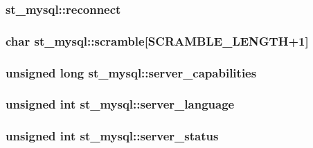 \subsubsection[{reconnect}]{ st\+\_\+mysql\+::reconnect}\label{structst__mysql_a802266361a427c12d6cb29a27f8889b1}
\hypertarget{structst__mysql_ae6e34dfb59ec6f6842f65a58eb6bee38}{}
\subsubsection[{scramble}]{\setlength{\rightskip}{0pt plus 5cm}char st\+\_\+mysql\+::scramble\mbox{[}{\bf S\+C\+R\+A\+M\+B\+L\+E\+\_\+\+L\+E\+N\+G\+T\+H}+1\mbox{]}}\label{structst__mysql_ae6e34dfb59ec6f6842f65a58eb6bee38}
\hypertarget{structst__mysql_ab9c7460496350f7aa331c104aa54717d}{}
\subsubsection[{server\+\_\+capabilities}]{\setlength{\rightskip}{0pt plus 5cm}unsigned long st\+\_\+mysql\+::server\+\_\+capabilities}\label{structst__mysql_ab9c7460496350f7aa331c104aa54717d}
\hypertarget{structst__mysql_a855f117151afa573d46f988e2e01393a}{}
\subsubsection[{server\+\_\+language}]{\setlength{\rightskip}{0pt plus 5cm}unsigned int st\+\_\+mysql\+::server\+\_\+language}\label{structst__mysql_a855f117151afa573d46f988e2e01393a}
\hypertarget{structst__mysql_ab875d849ff6f754a85986fe538408667}{}
\subsubsection[{server\+\_\+status}]{\setlength{\rightskip}{0pt plus 5cm}unsigned int st\+\_\+mysql\+::server\+\_\+status}\label{structst__mysql_ab875d849ff6f754a85986fe538408667}
\hypertarget{structst__mysql_a72928c42be914f8c12aa24331c542b69}{}
